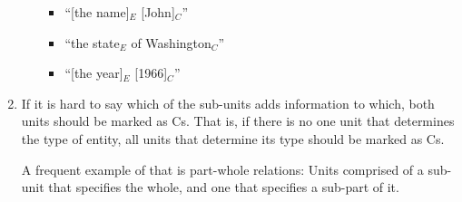 \documentclass[11pt]{article}
\newcommand{\german}[1]{{\color{red}#1$^{de}$}}
\begin{document}
\begin{enumerate}
\begin{itemize}
		\begin{itemize}
		\item
			``[the name]$_E$ [John]$_C$''
		\item
			``the state$_E$ of Washington$_C$''
		\item
			``[the year]$_E$ [1966]$_C$''
                \end{itemize}
  \end{itemize}

\item
  If it is hard to say which of the sub-units adds information to which, both units should be marked as Cs. That is,
  if there is no one unit that determines the type of entity, all units that determine its type should be marked as Cs.

  A frequent example of that is part-whole relations: Units comprised of a sub-unit that specifies the whole,
  and one that specifies a sub-part of it. 


\end{enumerate}



\end{document}
